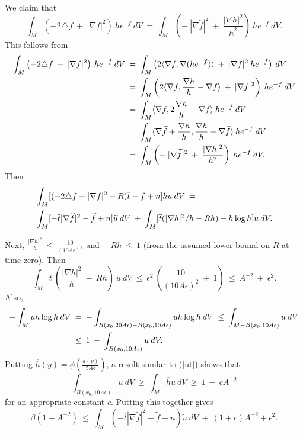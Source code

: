 \documentclass[12pt]{amsart}
\numberwithin{equation}{section}
\theoremstyle{plain}
\theoremstyle{definition}
\theoremstyle{remark}
\begin{document}
We claim that
\begin{equation}
\int_M \left( - 2 \triangle f \: + \: |\nabla f|^2 \right) \: h e^{-f} \: 
dV \: = \: \int_M \left( - \: |\nabla \widetilde{f}|^2 \: + \:
\frac{|\nabla h|^2}{h^2} \right) \: he^{-f} \: dV.
\end{equation}
This follows from
\begin{align}
\int_M \left( - 2 \triangle f \: + \: |\nabla f|^2 \right) \: h e^{-f} \: 
dV \: & = \: 
\int_M \left( 2 \langle \nabla f, \nabla(he^{-f}) \rangle \: + \: 
|\nabla f|^2 \: h e^{-f} \right) \: 
dV \\
& = \: \int_M \left( 2 \langle \nabla f, \frac{\nabla h}{h} -
\nabla f \rangle \: + \: 
|\nabla f|^2  \right) \: h e^{-f} \: 
dV \notag \\
& = \: \int_M \langle \nabla f, 2 \frac{\nabla h}{h} -
\nabla f \rangle \: h e^{-f} \: dV \notag \\
& = \:
\int_M \langle \nabla \widetilde{f} + \frac{\nabla h}{h}, \frac{\nabla h}{h} -
\nabla \widetilde{f} \rangle \: h e^{-f} \: dV \notag \\
& = \:
\int_M \left( - \: |\nabla \widetilde{f}|^2 \: + \:
\frac{|\nabla h|^2}{h^2} \right) \: he^{-f} \: dV. \notag 
\end{align}
Then
\begin{align}
& \int_M [(-2\triangle f + |\nabla f|^2 - R) \overline{t}
- f + n]hu \: dV \: = \\
& \int_M [- \overline{t} |\nabla \widetilde{f}|^2 - \widetilde{f} + n]
\widetilde{u} \: dV \: + \:
\int_M [\overline{t}(|\nabla h|^2/h - Rh) - h \log h ] u \: dV. \notag
\end{align}

Next, $\frac{|\nabla h|^2}{h} \: \le \: \frac{10}{(10A\epsilon)^2}$ and
$- \: Rh \: \le \: 1$ (from the assumed lower bound on $R$ at time zero). Then
\begin{equation}
\int_M \overline{t} \: \left( \frac{|\nabla h|^2}{h} \: - \: R h \right)
\: u \: dV \: \le \: \epsilon^2 \: \left( \frac{10}{(10A\epsilon)^2} \: + \:
1 \right) \: \le \: A^{-2} \: + \: \epsilon^2.
\end{equation}
Also,
\begin{align}
- \int_M uh \log{h} \: dV \: & = \: -
\int_{B(x_0, 20 A \epsilon) - B(x_0, 10 A \epsilon)} uh \log{h} \: dV \: 
\le \: \int_{M - B(x_0, 10 A \epsilon)} u \: dV \\
&\le \: 1 \: - \: \int_{B(x_0, 10 A \epsilon)} u \: dV. \notag
\end{align}
Putting $\overline{h}(y) = \phi \left( \frac{d(y)}{5A\epsilon} \right)$, a result
similar to (\ref{ut}) shows that 
\begin{equation}
\int_{B(x_0, 10 A \epsilon)} u \: dV \: \ge \:
\int_{M} \overline{h} u \: dV \: \ge \:
 1 \: - \: c A^{-2}
 \end{equation}
for an appropriate constant $c$. 
Putting this together gives
\begin{equation} \label{somme}
\beta(1 - A^{-2}) \: \le \: \int_M \left( - \overline{t} |\nabla \widetilde{f}|^2 - \widetilde{f} + n
\right)
\widetilde{u} \: dV \: + \: (1+c) A^{-2} + \epsilon^2.
\end{equation}
\end{document}
